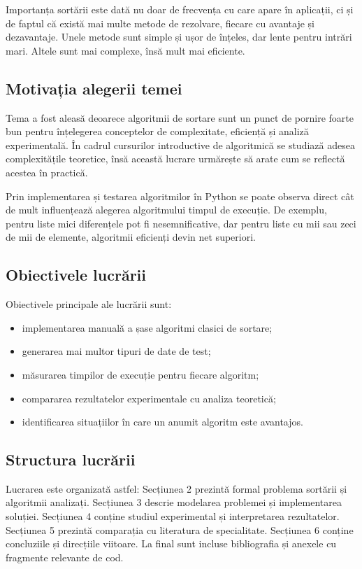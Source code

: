 \documentclass[a4paper,12pt]{article}
\begin{document}
Importanța sortării este dată nu doar de frecvența cu care apare în aplicații, ci și de faptul că există mai multe metode de rezolvare, fiecare cu avantaje și dezavantaje. Unele metode sunt simple și ușor de înțeles, dar lente pentru intrări mari. Altele sunt mai complexe, însă mult mai eficiente.

\subsection{Motivația alegerii temei}
Tema a fost aleasă deoarece algoritmii de sortare sunt un punct de pornire foarte bun pentru înțelegerea conceptelor de complexitate, eficiență și analiză experimentală. În cadrul cursurilor introductive de algoritmică se studiază adesea complexitățile teoretice, însă această lucrare urmărește să arate cum se reflectă acestea în practică.

Prin implementarea și testarea algoritmilor în Python se poate observa direct cât de mult influențează alegerea algoritmului timpul de execuție. De exemplu, pentru liste mici diferențele pot fi nesemnificative, dar pentru liste cu mii sau zeci de mii de elemente, algoritmii eficienți devin net superiori.

\subsection{Obiectivele lucrării}
Obiectivele principale ale lucrării sunt:
\begin{itemize}
    \item implementarea manuală a șase algoritmi clasici de sortare;
    \item generarea mai multor tipuri de date de test;
    \item măsurarea timpilor de execuție pentru fiecare algoritm;
    \item compararea rezultatelor experimentale cu analiza teoretică;
    \item identificarea situațiilor în care un anumit algoritm este avantajos.
\end{itemize}

\subsection{Structura lucrării}
Lucrarea este organizată astfel: Secțiunea 2 prezintă formal problema sortării și algoritmii analizați. Secțiunea 3 descrie modelarea problemei și implementarea soluției. Secțiunea 4 conține studiul experimental și interpretarea rezultatelor. Secțiunea 5 prezintă comparația cu literatura de specialitate. Secțiunea 6 conține concluziile și direcțiile viitoare. La final sunt incluse bibliografia și anexele cu fragmente relevante de cod.
\end{document}
